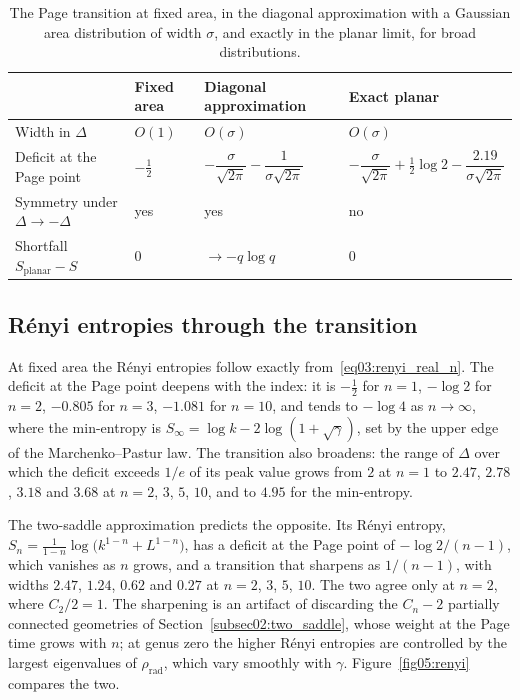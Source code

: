 \documentclass[11pt,letterpaper]{article}
\theoremstyle{plain}
\theoremstyle{definition}
\theoremstyle{remark}
\begin{document}
\begin{table}[htbp]
\centering
\caption{The Page transition at fixed area, in the diagonal approximation with a Gaussian area distribution of width $\sigma$, and exactly in the planar limit, for broad distributions.}
\label{tab05:comparison}
\small
\begin{tabular}{llll}
\toprule
& Fixed area & Diagonal approximation & Exact planar \\
\midrule
Width in $\Delta$ & $O(1)$ & $O(\sigma)$ & $O(\sigma)$ \\[2pt]
Deficit at the Page point & $-\tfrac12$ & $-\dfrac{\sigma}{\sqrt{2\pi}} - \dfrac{1}{\sigma\sqrt{2\pi}}$ & $-\dfrac{\sigma}{\sqrt{2\pi}} + \tfrac12\log 2 - \dfrac{2.19}{\sigma\sqrt{2\pi}}$ \\[6pt]
Symmetry under $\Delta \to -\Delta$ & yes & yes & no \\[2pt]
Shortfall $S_{\mathrm{planar}} - S$ & $0$ & $\to -q\log q$ & $0$ \\
\bottomrule
\end{tabular}
\end{table}

\subsection{R\'enyi entropies through the transition}
\label{subsec05:renyi}

At fixed area the R\'enyi entropies follow exactly from~\eqref{eq03:renyi_real_n}. The deficit at the Page point deepens with the index: it is $-\tfrac12$ for $n = 1$, $-\log 2$ for $n = 2$, $-0.805$ for $n = 3$, $-1.081$ for $n = 10$, and tends to $-\log 4$ as $n \to \infty$, where the min-entropy is $S_\infty = \log k - 2\log(1 + \sqrt{\gamma})$, set by the upper edge of the Marchenko--Pastur law. The transition also broadens: the range of $\Delta$ over which the deficit exceeds $1/e$ of its peak value grows from $2$ at $n = 1$ to $2.47$, $2.78$, $3.18$ and $3.68$ at $n = 2$, $3$, $5$, $10$, and to $4.95$ for the min-entropy.

The two-saddle approximation predicts the opposite. Its R\'enyi entropy, $S_n = \frac{1}{1-n}\log\big(k^{1-n} + L^{1-n}\big)$, has a deficit at the Page point of $-\log 2/(n-1)$, which vanishes as $n$ grows, and a transition that sharpens as $1/(n-1)$, with widths $2.47$, $1.24$, $0.62$ and $0.27$ at $n = 2$, $3$, $5$, $10$.
 The two agree only at $n = 2$, where $C_2/2 = 1$. The sharpening is an artifact of discarding the $C_n - 2$ partially connected geometries of Section~\ref{subsec02:two_saddle}, whose weight at the Page time grows with $n$; at genus zero the higher R\'enyi entropies are controlled by the largest eigenvalues of $\rho_{\mathrm{rad}}$, which vary smoothly with $\gamma$. Figure~\ref{fig05:renyi} compares the two.
\end{document}

